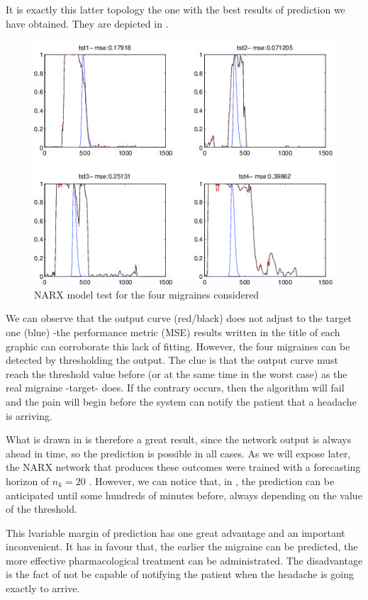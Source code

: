 It is exactly this latter topology the one with the best results of prediction we have obtained. They are depicted in .
\begin{figure}
\centering
\includegraphics[width=\columnwidth]{images/results/trn3_na-nb1-nk20_NN3}
\caption{NARX model test for the four migraines considered}
\label{fig:narxTest}
\end{figure}

We can observe that the output curve (red/black) does not adjust to the target one (blue) -the performance metric (MSE) results written in the title of each graphic can corroborate this lack of fitting. However, the four migraines can be detected by thresholding the output. The clue is that the output curve must reach the threshold value before (or at the same time in the worst case) as the real migraine -target- does. If the contrary occurs, then the algorithm will fail and  the pain will begin before the system can notify the patient that a headache is arriving.

What is drawn in  is therefore a great result, since the network output is always ahead in time, so the prediction is possible in all cases. 
As we will expose later, the NARX network that produces these outcomes were trained with a forecasting horizon of $n_{k}=20$ . 
However, we can notice that, in , the prediction can be anticipated until some hundreds of minutes before, always depending on the value of the threshold. 

This lvariable margin of prediction has one great advantage and an important inconvenient. 
It has in favour that, the earlier the migraine can be predicted, the more effective pharmacological treatment can be administrated.
The disadvantage is the fact of not be capable of notifying the patient when the headache is going exactly to arrive.

